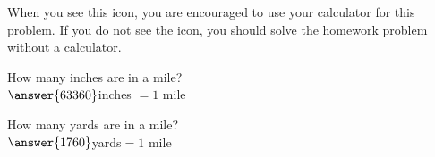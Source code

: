 \documentclass{ximera}
\author{David Kish}
\begin{document}
\calcHW When you see this icon, you are encouraged to use your calculator for this problem.  If you do not see the icon, you should solve the homework problem without a calculator.
\begin{exercise} 
How many inches are in a mile? \\
$\answer{63360}$\calcHW inches $= 1$ mile 
\end{exercise}
 \begin{exercise}
 How many yards are in a mile? \\
 $\answer{1760}$\calcHW yards$ = 1$ mile
 \end{exercise}
\end{document}
